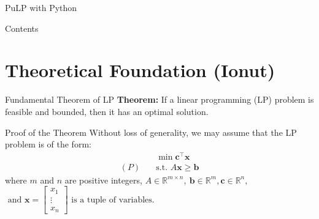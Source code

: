 \documentclass{purdue-slide}
\author{Stan Ioan-Victor, Ioan-Gabriel Spatariu, Ana Sabina Tatar, Mihnea-Gabriel Vasile, Tepfenhart Bertold }
\begin{document}
\begin{titleframe}{PuLP with Python}
	\subtitle{Solving MILP problems using the GLPK solver.}
	\maketitle
\end{titleframe}

\begin{frame}{Contents}
	\tableofcontents
\end{frame}

\section{Theoretical Foundation (Ionut)}

\begin{frame}{Fundamental Theorem of LP}
	\textbf{Theorem:} If a linear programming (LP) problem is feasible and bounded, then it has an optimal solution.
\end{frame}

\begin{frame}{Proof of the Theorem}
	Without loss of generality, we may assume that the LP problem is of the form:
	\[
		\begin{aligned}
			& \min \mathbf{c}^\top \mathbf{x} \\
			(P) \quad & \text{s.t. } A\mathbf{x} \geq \mathbf{b}
		\end{aligned}
	\]
	where $m$ and $n$ are positive integers,  $A \in \mathbb{R}^{m \times n}, \ \mathbf{b} \in \mathbb{R}^m, \mathbf{c} \in \mathbb{R}^n,$ $ \text{ and }
	\mathbf{x} =
	\begin{bmatrix}
		x_1 \\
		\vdots \\
		x_n
	\end{bmatrix} \text{ is a tuple of variables. }$

\end{frame}
\end{document}
